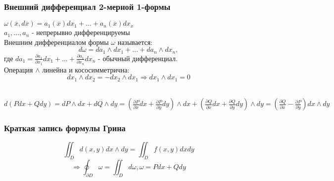 \subsubsection{Внешний дифференциал 2-мерной 1-формы}
    \begin{definition*}    
        $\omega\left(\overline{x}, d\overline{x}\right) = a_1\left(\overline{x}\right)dx_1 + ... + a_n\left(\overline{x}\right)dx_x$\\
        $a_1, ..., a_n$ - непрерывно дифференцируемы\\
        Внешним дифференциалом формы $\omega$ называется:\\
        $$d\omega = da_1 \wedge dx_1 + ... + da_n \wedge dx_n,$$
        где $da_1 = \frac{\partial a_1}{\partial x_1} dx_1 + ... + \frac{\partial a_1}{\partial x_n}dx_n$ - обычный дифференциал.\\
        Операция $\wedge$ линейна и кососимметрична:\\
        $$dx_1 \wedge dx_2 = - dx_2 \wedge dx_1 \Rightarrow dx_1 \wedge dx_1 = 0$$\\
    \end{definition*}
    
\begin{example}    
    $d\left(Pdx + Qdy\right) = dP \wedge dx + dQ \wedge dy = \left(\frac{\partial P}{\partial x}dx + \frac{\partial P}{\partial y}dy\right) \wedge dx + \left(\frac{\partial Q}{\partial x}dx + \frac{\partial Q}{\partial y}dy\right) \wedge dy = \left(\frac{\partial Q}{\partial x} - \frac{\partial P}{\partial y}\right)dx \wedge dy$\\
\end{example}
    
\subsubsection{Краткая запись формулы Грина}
    $$\iint_D d\left(x, y\right)dx \wedge dy = \iint_D f\left(x, y\right) dxdy$$
    $$\Rightarrow \oint_{\partial D} \omega = \iint_D d\omega, \omega = Pdx + Qdy$$